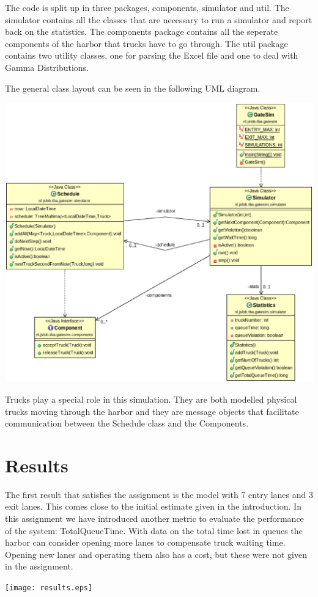 \documentclass{article}
\begin{document}
The code is split up in three packages, components, simulator and
util. The simulator contains all the classes that are necessary to run
a simulator and report back on the statistics. The components package
contains all the seperate components of the harbor that trucks have to
go through. The util package contains two utility classes, one for
parsing the Excel file and one to deal with Gamma Distributions.

The general class layout can be seen in the following UML diagram.

\includegraphics[scale=0.4]{Simulator.eps}

Trucks play a special role in this simulation. They are both modelled
physical trucks moving through the harbor and they are message objects
that facilitate communication between the Schedule class and the
Components.

\section{Results}

The first result that satisfies the assignment is the model with 7
entry lanes and 3 exit lanes. This comes close to the initial estimate
given in the introduction. In this assignment we have introduced
another metric to evaluate the performance of the system:
TotalQueueTime. With data on the total time lost in queues the harbor
can consider opening more lanes to compensate truck waiting
time. Opening new lanes and operating them also has a cost, but these
were not given in the assignment.

\texttt{[image: results.eps]}
\end{document}
